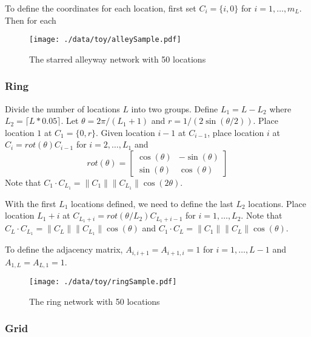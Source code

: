 \documentclass[11pt]{article}
\begin{document}
To define the coordinates for each location, first set $C_{i} =
    \lbrace i,0 \rbrace$ for $i = 1,\ldots,m_L$.  Then for each 


\begin{figure}[htb]
\centering
\texttt{[image: ./data/toy/alleySample.pdf]}
\caption{\label{fig:alley50}The starred alleyway network with 50 locations}
\end{figure}



\subsubsection{Ring}
\label{sec-3-1-3}

Divide the number of locations $L$ into two groups.  Define $L_1 = L -
    L_2$ where $L_2 = \lceil L*0.05 \rceil$.  Let $\theta = 2\pi/(L_1+1)$
and $r = 1/(2\sin(\theta/2))$.  Place location $1$ at $C_1 = \lbrace
    0,r \rbrace$.  Given location $i-1$ at $C_{i-1}$, place location $i$
at $C_i = rot(\theta) C_{i-1}$ for $i = 2,\ldots,L_1$ and
\begin{equation*}
rot(\theta) = \left[
\begin{matrix}
\cos(\theta) & -\sin(\theta)\\
\sin(\theta) & \cos(\theta)
\end{matrix}
\right]
\end{equation*}
Note that $C_{1} \cdot C_{L_1} = \|C_{1}\| \|C_{L_1}\| \cos(2\theta)$.

With the first $L_1$ locations defined, we need to define the last
$L_2$ locations.  Place location $L_1 + i$ at $C_{L_1 + i} =
    rot(\theta/L_2)C_{L_1 + i - 1}$ for $i = 1,\ldots,L_2$.  Note that
$C_{L} \cdot C_{L_1} = \|C_{L}\| \|C_{L_1}\| \cos(\theta)$ and $C_{1}
    \cdot C_{L} = \|C_{1}\| \|C_{L}\| \cos(\theta)$.

To define the adjacency matrix, $A_{i,i+1} = A_{i+1,i} = 1$ for $i =
    1,\ldots,L-1$ and $A_{1,L} = A_{L,1} = 1$.



\begin{figure}[htb]
\centering
\texttt{[image: ./data/toy/ringSample.pdf]}
\caption{\label{fig:ring50}The ring network with 50 locations}
\end{figure}




\subsubsection{Grid}
\label{sec-3-1-4}
\end{document}
